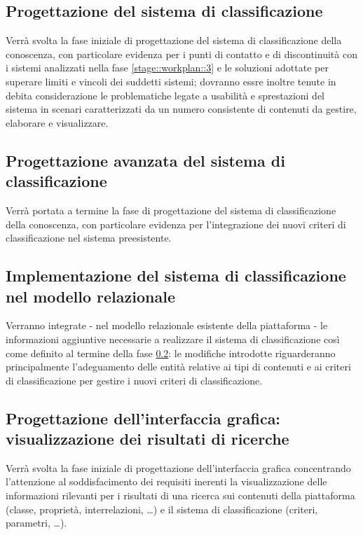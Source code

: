 \documentclass[10pt,a4paper,hidelinks]{scrartcl} %
\begin{document}
	\subsection{Progettazione del sistema di classificazione}
	\label{stage::workplan::4}
	Verrà svolta la fase iniziale di progettazione del sistema di classificazione della conoscenza, con particolare evidenza per i punti di contatto e di discontinuità con i sistemi analizzati nella fase \ref{stage::workplan::3} e le soluzioni adottate per superare limiti e vincoli dei suddetti sistemi; dovranno essre inoltre tenute in debita considerazione le problematiche legate a usabilità e sprestazioni del sistema in scenari caratterizzati da un numero consistente di contenuti da gestire, elaborare e visualizzare.

	\subsection{Progettazione avanzata del sistema di classificazione}
	\label{stage::workplan::5}
	Verrà portata a termine la fase di progettazione del sistema di classificazione della conoscenza, con particolare evidenza per l'integrazione dei nuovi criteri di classificazione nel sistema preesistente.
	
	\subsection{Implementazione del sistema di classificazione nel modello relazionale}
	\label{stage::workplan::6}
	Verranno integrate - nel modello relazionale esistente della piattaforma - le informazioni aggiuntive necessarie a realizzare il sistema di classificazione così come definito al termine della fase \ref{stage::workplan::5}: le modifiche introdotte riguarderanno principalmente l'adeguamento delle entità relative ai tipi di contenuti e ai criteri di classificazione per gestire i nuovi criteri di classificazione.

	\subsection{Progettazione dell'interfaccia grafica: visualizzazione dei risultati di ricerche}
	\label{stage::workplan::7}
	Verrà svolta la fase iniziale di progettazione dell'interfaccia grafica concentrando l'attenzione al soddisfacimento dei requisiti inerenti la visualizzazione delle informazioni rilevanti per i risultati di una ricerca sui contenuti della piattaforma (classe, proprietà, interrelazioni, \ldots) e il sistema di classificazione (criteri, parametri, \ldots).
\end{document}
